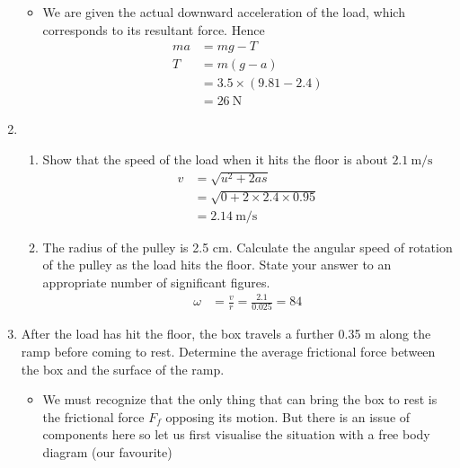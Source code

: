 \documentclass[a4paper,12pt]{article}
\begin{document}
\begin{enumerate}[label=(\alph*)]
\begin{itemize}
\begin{figure}[H]
\begin{tikzpicture}
                  \end{tikzpicture}
                \end{figure}
          \item We are given the actual downward acceleration of the load, which corresponds to its resultant force. Hence
                \begin{align*}
                  ma & = mg - T                  \\
                  T  & = m(g-a)                  \\
                     & = 3.5 \times (9.81 - 2.4) \\
                     & = \SI{26}{\newton}
                \end{align*}
        \end{itemize}
  \item \begin{enumerate}[label=(\roman*)]
          \item Show that the speed of the load when it hits the floor is about $\SI{2.1}{\m\per\s}$
                \begin{align*}
                  v & = \sqrt{u^2 + 2as}                    \\
                    & = \sqrt{0 + 2 \times 2.4 \times 0.95} \\
                    & = \SI{2.14}{\m\per\s}
                \end{align*}
          \item The radius of the pulley is 2.5 cm. Calculate the angular speed of rotation of the pulley as the load hits the floor. State your answer to an appropriate number of significant figures.
                \begin{align*}
                  \omega & = \frac{v}{r} = \frac{2.1}{0.025} = 84
                \end{align*}
        \end{enumerate}
  \item After the load has hit the floor, the box travels a further 0.35 m along the ramp before coming to rest. Determine the average frictional force between the box and the surface of the ramp.
        \begin{itemize}
          \item We must recognize that the only thing that can bring the box to rest is the frictional force $F_f$ opposing its motion. But there is an issue of components here so let us first visualise the situation with a free body diagram (our favourite)
                \begin{figure}[H]
                  \centering
\end{figure}
\end{itemize}
\end{enumerate}
\end{document}
